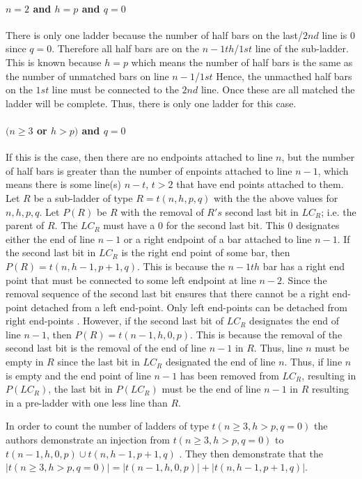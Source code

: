 \paragraph{$n=2$ and $h=p$ and $q=0$}
There is only one ladder because the number of half bars 
on the last/$2nd$ line is 0 since $q=0$. Therefore all half bars are on the 
$n-1th$/$1st$ line of the sub-ladder. This is known because 
$h=p$ which means the number of half bars is the same as 
the number of unmatched bars on line $n-1$/$1st$ Hence, the unmacthed 
half bars on the $1st$ line must be connected to the $2nd$ 
line. Once these are all matched the ladder will be complete. 
Thus, there is only one ladder for this case.

\paragraph{$(n \geq 3$ or $h>p)$ and $q=0$}
If this is the case, then there are no endpoints attached to 
line $n$, but the number of half bars is greater than the 
number of enpoints attached to line $n-1$, which means there is 
some line(s) $n-t$, $t>2$ that have end points attached to them.
Let $R$ be a sub-ladder of type $R=t(n,h,p,q)$
with the the above values for $n,h,p,q$. Let $P(R)$ be 
$R$ with the removal of $R's$ second last bit in $LC_{R}$; i.e. the parent of 
$R$.  The $LC_{R}$ must have a $0$ for the second last bit. This $0$ designates either the 
end of line $n-1$ or a right endpoint of a bar attached to line $n-1$. 
If the second last bit in $LC_{R}$ is the right end point of some 
bar, then $P(R)=t(n,h-1,p+1,q)$. This is because the $n-1th$ bar 
has a right end point that must be connected to some left  
endpoint at line $n-2$. Since the removal sequence of the second 
last bit ensures that there cannot be a right end-point detached 
from a left end-point. Only left end-points can be detached 
from right end-points \cite{A6}. However, if the second last bit 
of $LC_{R}$ designates the end of line $n-1$, then $P(R)=t(n-1,h,0,p)$. 
This is because the removal of the second last bit 
is the removal of the end of line $n-1$ in $R$. Thus, 
line $n$ must be empty in $R$ since the last bit in $LC_{R}$
designated the end of line $n$. Thus, if line $n$ is empty 
and the end point of line $n-1$ has been removed from $LC_{R}$, 
resulting in $P(LC_{R})$, the last bit in $P(LC_{R})$ must be 
the end of line $n-1$ in $R$ resulting in a pre-ladder with one 
less line than $R$.\par  
In order to count the number of ladders of type 
$t(n\geq3, h>p, q=0)$ the authors demonstrate an injection 
from $t(n\geq3, h>p, q=0)$ to $t(n-1,h,0,p) \cup t(n,h-1,p+1,q)$ \cite{A6}.
They then demonstrate that the $|t(n\geq3, h>p, q=0)|=|t(n-1,h,0,p)| + |t(n,h-1,p+1,q)|$.

